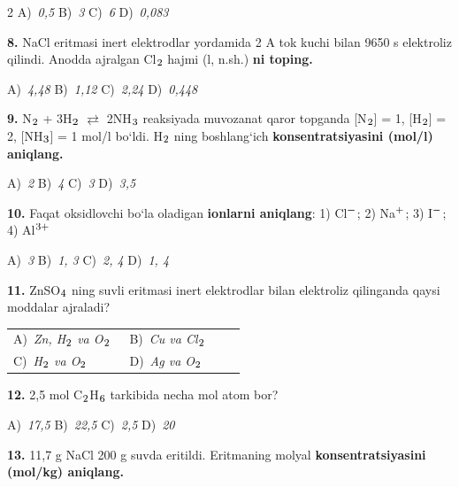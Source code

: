 \documentclass[11pt,a4paper]{article}
\renewcommand{\textsubscript}[1]{\ensuremath{_{\text{\fontsize{8}{8}\selectfont #1}}}}
\renewcommand{\textsuperscript}[1]{\ensuremath{^{\text{\fontsize{8}{8}\selectfont #1}}}}
\begin{document}
\begin{multicols}{2}
\noindent A)~\textsl{0,5} \hfill B)~\textsl{3} \hfill C)~\textsl{6} \hfill D)~\textsl{0,083}\par
\vspace{4pt}
\noindent\textbf{8.} NaCl eritmasi inert elektrodlar yordamida 2 A tok kuchi bilan 9650 s elektroliz qilindi. Anodda ajralgan Cl\textsubscript{2} hajmi (l, n.sh.) \textbf{ni toping.}

\noindent A)~\textsl{4,48} \hfill B)~\textsl{1,12} \hfill C)~\textsl{2,24} \hfill D)~\textsl{0,448}\par
\vspace{4pt}
\noindent\textbf{9.} N\textsubscript{2} + 3H\textsubscript{2} $\rightleftarrows$ 2NH\textsubscript{3} reaksiyada muvozanat qaror topganda [N\textsubscript{2}] = 1, [H\textsubscript{2}] = 2, [NH\textsubscript{3}] = 1 mol/l bo`ldi. H\textsubscript{2} ning boshlang`ich \textbf{konsentratsiyasini (mol/l) aniqlang.}

\noindent A)~\textsl{2} \hfill B)~\textsl{4} \hfill C)~\textsl{3} \hfill D)~\textsl{3,5}\par
\vspace{4pt}
\noindent\textbf{10.} Faqat oksidlovchi bo`la oladigan \textbf{ionlarni aniqlang}: 1) Cl\textsuperscript{$-$}; 2) Na\textsuperscript{+}; 3) I\textsuperscript{$-$}; 4) Al\textsuperscript{3+}

\noindent A)~\textsl{3} \hfill B)~\textsl{1, 3} \hfill C)~\textsl{2, 4} \hfill D)~\textsl{1, 4}\par
\vspace{4pt}
\noindent\textbf{11.} ZnSO\textsubscript{4} ning suvli eritmasi inert elektrodlar bilan elektroliz qilinganda qaysi moddalar ajraladi?

\noindent\begin{tabular}{@{}p{0.47\linewidth}@{}p{0.47\linewidth}@{}}
A)~\textsl{Zn, H\textsubscript{2} va O\textsubscript{2}} & B)~\textsl{Cu va Cl\textsubscript{2}} \\
C)~\textsl{H\textsubscript{2} va O\textsubscript{2}} & D)~\textsl{Ag va O\textsubscript{2}} \\
\end{tabular}\par
\vspace{4pt}
\noindent\textbf{12.} 2,5 mol C\textsubscript{2}H\textsubscript{6} tarkibida necha mol atom bor?

\noindent A)~\textsl{17,5} \hfill B)~\textsl{22,5} \hfill C)~\textsl{2,5} \hfill D)~\textsl{20}\par
\vspace{4pt}
\noindent\textbf{13.} 11,7 g NaCl 200 g suvda eritildi. Eritmaning molyal \textbf{konsentratsiyasini (mol/kg) aniqlang.}


\end{multicols}
\end{document}
